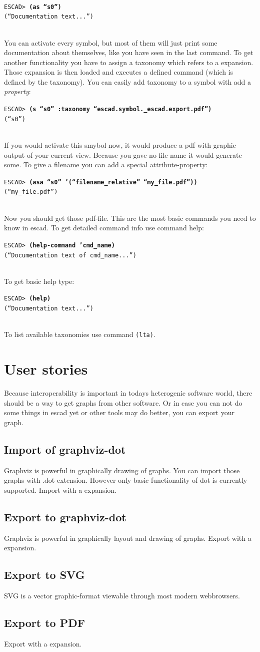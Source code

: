 \documentclass[a4paper, 12pt, openany]{scrbook}
\newcommand{\escadcmdline}[2]{\\\setlength{\fboxsep}{2pt}\colorbox{black!20}{\parbox{\textwidth}{\texttt{ESCAD> \textbf{#1}\\#2}}}\\}
\begin{document}
\escadcmdline{(as ``s0'')}{(``Documentation text...'')}
You can activate every symbol, but most of them will just print some documentation about themselves, like you have seen in the last command. To get another functionality you have to assign a taxonomy which refers to a expansion. Those expansion is then loaded and executes a defined command (which is defined by the taxonomy).
You can easily add taxonomy to a symbol with add a \emph{property}:
\escadcmdline{(s ``s0'' :taxonomy ``escad.symbol.\_escad.export.pdf'')}{(``s0'')}
If you would activate this smybol now, it would produce a pdf with graphic output of your current view. Because you gave no file-name it would generate some. To give a filename you can add a special attribute-property:
\escadcmdline{(asa ``s0'' '(``filename\_relative'' ``my\_file.pdf''))}{(``my\_file.pdf'')}
Now you should get those pdf-file.
This are the most basic commands you need to know in escad. To get detailed command info use command help:
\escadcmdline{(help-command 'cmd\_name)}{(``Documentation text of cmd\_name...'')}
To get basic help type:
\escadcmdline{(help)}{(``Documentation text...'')}
To list available taxonomies use command \texttt{(lta)}.
\section{User stories}
Because interoperability is important in todays heterogenic software world, there should be a way to get graphs from other software. Or in case you can not do some things in escad yet or other tools may do better, you can export your graph.
\subsection{Import of graphviz-dot}
Graphviz is powerful in graphically drawing of graphs. You can import those graphs with .dot extension. However only basic functionality of dot is currently supported. Import with a expansion.
\subsection{Export to graphviz-dot}
Graphviz is powerful in graphically layout and drawing of graphs. Export with a expansion.
\subsection{Export to SVG}
SVG is a vector graphic-format viewable through most modern webbrowsers.
\subsection{Export to PDF}
Export with a expansion.
\end{document}
